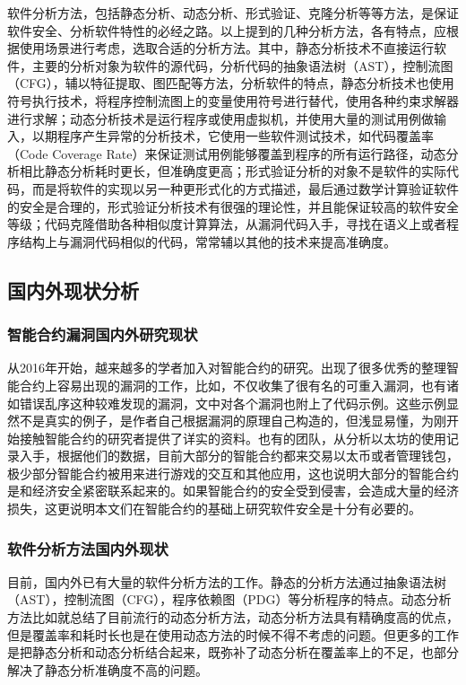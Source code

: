 软件分析方法，包括静态分析、动态分析、形式验证、克隆分析等等方法，是保证软件安全、分析软件特性的必经之路。以上提到的几种分析方法，各有特点，应根据使用场景进行考虑，选取合适的分析方法。其中，静态分析技术不直接运行软件，主要的分析对象为软件的源代码，分析代码的抽象语法树（AST），控制流图（CFG），辅以特征提取\cite{deckard}、图匹配等方法，分析软件的特点，静态分析技术也使用符号执行技术，将程序控制流图上的变量使用符号进行替代，使用各种约束求解器进行求解；动态分析技术是运行程序或使用虚拟机，并使用大量的测试用例做输入，以期程序产生异常的分析技术，它使用一些软件测试技术，如代码覆盖率（Code Coverage Rate）来保证测试用例能够覆盖到程序的所有运行路径，动态分析相比静态分析耗时更长，但准确度更高；形式验证分析的对象不是软件的实际代码，而是将软件的实现以另一种更形式化的方式描述，最后通过数学计算验证软件的安全是合理的，形式验证分析技术有很强的理论性，并且能保证较高的软件安全等级；代码克隆借助各种相似度计算算法，从漏洞代码入手，寻找在语义上或者程序结构上与漏洞代码相似的代码，常常辅以其他的技术来提高准确度。

\subsection{国内外现状分析}

\subsubsection{智能合约漏洞国内外研究现状}

从2016年开始，越来越多的学者加入对智能合约的研究。出现了很多优秀的整理智能合约上容易出现的漏洞的工作，比如\cite{survey-on-attacks}，不仅收集了很有名的可重入漏洞，也有诸如错误乱序这种较难发现的漏洞，文中对各个漏洞也附上了代码示例。这些示例显然不是真实的例子，是作者自己根据漏洞的原理自己构造的，但浅显易懂，为刚开始接触智能合约的研究者提供了详实的资料。也有的团队\cite{survey-on-smart-contracts}，从分析以太坊的使用记录入手，根据他们的数据，目前大部分的智能合约都来交易以太币或者管理钱包，极少部分智能合约被用来进行游戏的交互和其他应用，这也说明大部分的智能合约是和经济安全紧密联系起来的。如果智能合约的安全受到侵害，会造成大量的经济损失，这更说明本文们在智能合约的基础上研究软件安全是十分有必要的。

\subsubsection{软件分析方法国内外现状}

目前，国内外已有大量的软件分析方法的工作。静态的分析方法通过抽象语法树（AST），控制流图（CFG），程序依赖图（PDG）等分析程序的特点。动态分析方法比如\cite{survey-dynamic}就总结了目前流行的动态分析方法，动态分析方法具有精确度高的优点，但是覆盖率和耗时长也是在使用动态方法的时候不得不考虑的问题。但更多的工作是把静态分析和动态分析结合起来，既弥补了动态分析在覆盖率上的不足，也部分解决了静态分析准确度不高的问题。

